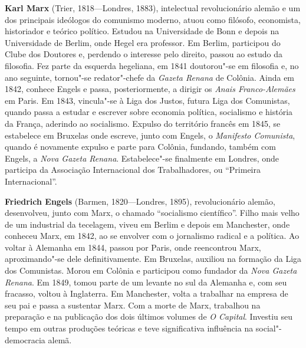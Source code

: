 \textbf{Karl Marx} (Trier, 1818---Londres, 1883), intelectual revolucionário
alemão e um dos principais ideólogos do comunismo moderno, atuou como
filósofo, economista, historiador e teórico político. Estudou na Universidade de
Bonn e depois na Universidade de Berlim, onde Hegel era professor. Em Berlim,
participou do Clube dos Doutores e, perdendo o interesse pelo direito, passou ao
estudo da filosofia. Fez parte da esquerda hegeliana, em 1841 doutorou"-se em
filosofia e, no ano seguinte, tornou"-se redator"-chefe da \textit{Gazeta Renana}
de Colônia. Ainda em 1842, conhece Engels e passa, posteriormente, a dirigir os
\textit{Anais Franco-Alemães} em Paris. Em 1843, vincula"-se à Liga dos Justos,
futura Liga dos Comunistas, quando passa a estudar e escrever sobre economia política,
socialismo e história da França, aderindo ao socialismo. Expulso do território francês em
1845, se estabelece em Bruxelas onde escreve, junto com Engels, o
\textit{Manifesto Comunista}, quando é novamente expulso e parte para Colônia, fundando,
também com Engels, a \textit{Nova Gazeta Renana}. 
Estabelece"-se finalmente em Londres, onde participa da Associação Internacional dos
Trabalhadores, ou “Primeira Internacional”. 

\textbf{Friedrich Engels} (Barmen, 1820---Londres, 1895), revolucionário alemão,
desenvolveu, junto com Marx, o chamado “socialismo científico”. Filho mais velho
de um industrial da tecelagem, viveu em Berlim e depois em Manchester, onde
conheceu Marx, em 1842, ao se envolver com o jornalismo radical e a política.
Ao voltar à Alemanha em 1844, passou por Paris, onde reencontrou Marx,
aproximando"-se dele definitivamente. Em Bruxelas, auxiliou na formação da Liga
dos Comunistas. Morou em Colônia e participou como fundador da \textit{Nova
Gazeta Renana}. Em 1849, tomou parte de um levante no sul da Alemanha e, com seu
fracasso, voltou à Inglaterra. Em Manchester, volta a trabalhar na empresa de
seu pai e passa a sustentar Marx. 
Com a morte de Marx, trabalhou na preparação e na publicação dos dois últimos
volumes de \textit{O Capital}. Investiu seu tempo em outras produções teóricas e
teve significativa influência na social"-democracia alemã.

